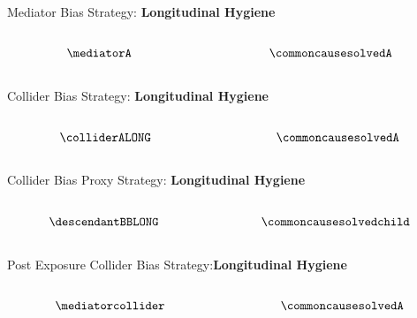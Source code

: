 \documentclass[
  ignorenonframetext,
  aspectratio=169,
]{beamer}
\begin{document}
\begin{frame}{Mediator Bias Strategy: \textbf{Longitudinal Hygiene}}
\label{mediator-bias-strategy-longitudinal-hygiene}
\begin{columns}[T]
\begin{column}{0.5\textwidth}
\[
\mediatorA
\]
\end{column}

\begin{column}{0.5\textwidth}
\[
\commoncausesolvedA
\]
\end{column}
\end{columns}
\end{frame}

\begin{frame}{Collider Bias Strategy: \textbf{Longitudinal Hygiene}}
\label{collider-bias-strategy-longitudinal-hygiene}
\begin{columns}[T]
\begin{column}{0.5\textwidth}
\[\colliderALONG\]
\end{column}

\begin{column}{0.5\textwidth}
\[\commoncausesolvedA\]
\end{column}
\end{columns}
\end{frame}

\begin{frame}{Collider Bias Proxy Strategy: \textbf{Longitudinal
Hygiene}}
\label{collider-bias-proxy-strategy-longitudinal-hygiene}
\begin{columns}[T]
\begin{column}{0.5\textwidth}
\[\descendantBBLONG\]
\end{column}

\begin{column}{0.5\textwidth}
\[\commoncausesolvedchild\]
\end{column}
\end{columns}
\end{frame}

\begin{frame}{Post Exposure Collider Bias Strategy:\textbf{Longitudinal
Hygiene}}
\label{post-exposure-collider-bias-strategylongitudinal-hygiene}
\begin{columns}[T]
\begin{column}{0.5\textwidth}
\[\mediatorcollider\]
\end{column}

\begin{column}{0.5\textwidth}
\[\commoncausesolvedA\]
\end{column}
\end{columns}
\end{frame}
\end{document}
